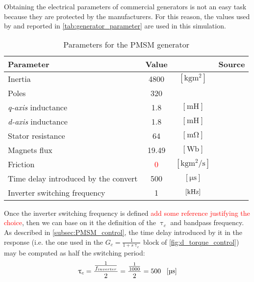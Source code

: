  Obtaining the electrical parameters of commercial generators is not an easy task because they are protected by the manufacturers. For this reason, the values used by \cite{10-MW_Direct-Drive_PMSG-Based_Wind_Energy_Conversion_System_Model} and reported in \autoref{tab:generator_parameter} are used in this simulation.
\begin{table}[htb]
    \caption{Parameters for the \acrlong{PMSM} generator}
    \centering
    \begin{tabular}{lccc}
    \toprule
    Parameter & Value & & Source\\ \midrule
    Inertia & 4800 & $\left[\si{\kilo\gram\square\meter}\right]$ & \cite{the_switch_datasheet} \\ \midrule	
    Poles & 320 & & \multirow{5}{*}{\cite{10-MW_Direct-Drive_PMSG-Based_Wind_Energy_Conversion_System_Model}} \\
    \textit{q-axis} inductance & 1.8 & $\left[\si{\milli\henry}\right]$ & \\
    \textit{d-axis} inductance & 1.8 & $\left[\si{\milli\henry}\right]$ &\\
    Stator resistance & 64 & $\left[\si{\milli\ohm}\right]$ &\\
    Magnets flux & 19.49 & $\left[\si{\weber}\right]$ &\\ \midrule
    Friction & \textcolor{red}{0} & $\left[\si{\kilo\gram\square\meter\per\second}\right]$ & \\
    Time delay introduced by the convert & 500 & $\left[\si{\micro\second}\right]$ & \\
    Inverter switching frequency & 1 & $\left[\si{\kilo\hertz}\right]$ & \\
    \bottomrule
    \end{tabular}
    \label{tab:generator_parameter}
\end{table}


 Once the inverter switching frequency is defined \textcolor{red}{add some reference justifying the choice}, then we can base on it the definition of the $\uptau_c$ and bandpass frequency. As described in \autoref{subsec:PMSM_control}, the time delay introduced by it in the response (i.e. the one used in the $G_c=\frac{1}{1+s\uptau_c}$ block of \autoref{fig:d_torque_control}) may be computed as half the switching period:
 \begin{gather}
 \uptau_{c}=\frac{\frac{1}{f_{inverter}}}{2}=\frac{\frac{1}{1000}}{2}=500 \ \ \left[\si{\micro \second}\right]
 \end{gather}

